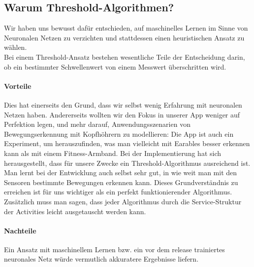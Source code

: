 \documentclass[a4paper,12pt]{article}
\begin{document}
\subsection{Warum Threshold-Algorithmen?}
Wir haben uns bewusst dafür entschieden, auf maschinelles Lernen im Sinne von Neuronalen Netzen zu verzichten und stattdessen einen heuristischen Ansatz zu wählen.\\
 Bei einem Threshold-Ansatz bestehen wesentliche Teile der Entscheidung darin, ob ein bestimmter Schwellenwert von einem Messwert überschritten wird.
\paragraph{Vorteile}
Dies hat einerseits den Grund, dass wir selbst wenig Erfahrung mit neuronalen Netzen haben. Andererseits wollten wir den Fokus in unserer App weniger auf Perfektion legen, und mehr darauf, Anwendungsszenarien von Bewegungserkennung mit Kopfhöhrern zu modellieren: Die App ist auch ein Experiment, um herauszufinden, was man vielleicht mit Earables besser erkennen kann als mit einem Fitness-Armband. Bei der Implementierung hat sich herausgestellt, dass für unsere Zwecke ein Threshold-Algorithmus ausreichend ist. Man lernt bei der Entwicklung auch selbst sehr gut, in wie weit man mit den Sensoren bestimmte Bewegungen erkennen kann. Dieses Grundverständnis zu erreichen ist für uns wichtiger als ein perfekt funktionierender Algorithmus.\\
Zusätzlich muss man sagen, dass jeder Algorithmus durch die Service-Struktur der Activities leicht ausgetauscht werden kann.
\paragraph{Nachteile}
Ein Ansatz mit maschinellem Lernen bzw. ein vor dem release trainiertes neuronales Netz würde vermutlich akkuratere Ergebnisse liefern. 
\end{document}
